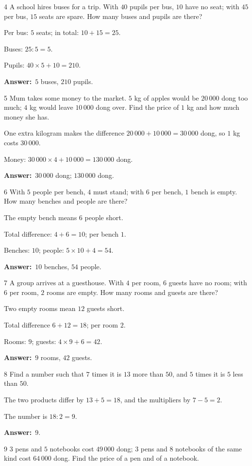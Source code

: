 \documentclass[11pt]{article}
\newif\ifsol \solfalse
\providecommand{\AnsWord}{Đáp số}
\newcommand{\dapso}[1]{\par\textbf{\AnsWord:}\ #1}
\newcommand{\probsol}[1]{%
  \begin{lrbox}{\solmeasure}\begin{minipage}{\dimexpr\linewidth-24pt\relax}#1\end{minipage}\end{lrbox}%
  \ifsol
    \begin{solbox}#1\end{solbox}%
  \else
    \setlength{\solht}{\dimexpr\ht\solmeasure+\dp\solmeasure+0.85cm\relax}%
    \ifdim\solht<1.35cm\setlength{\solht}{1.35cm}\fi
    \begin{tcolorbox}[colback=white,colframe=Line,boxrule=0.8pt,arc=5pt,
      left=8pt,right=8pt,top=4pt,bottom=4pt,height=\solht]{\footnotesize\color{Slate}\itshape\WorkWord}\end{tcolorbox}%
  \fi}
\newcommand{\gap}{\vspace{0.3cm}}
\def\WorkWord{Your work:}
\def\AnsWord{Answer}
\begin{document}
\gap
\begin{probbox}{4}{\relax}
A school hires buses for a trip. With $40$ pupils per bus, $10$ have no seat; with $45$ per bus, $15$ seats are spare. How many buses and pupils are there?
\end{probbox}
\probsol{
Per bus: $5$ seats; in total: $10+15=25$.\par Buses: $25:5=5$.\par Pupils: $40\times5+10=210$.
\dapso{$5$ buses, $210$ pupils.}}
\gap
\begin{probbox}{5}{\relax}
Mum takes some money to the market. $5$ kg of apples would be $20\,000$ dong too much; $4$ kg would leave $10\,000$ dong over. Find the price of $1$ kg and how much money she has.
\end{probbox}
\probsol{
One extra kilogram makes the difference $20\,000+10\,000=30\,000$ dong, so $1$ kg costs $30\,000$.\par Money: $30\,000\times4+10\,000=130\,000$ dong.
\dapso{$30\,000$ dong; $130\,000$ dong.}}
\gap
\begin{probbox}{6}{\relax}
With $5$ people per bench, $4$ must stand; with $6$ per bench, $1$ bench is empty. How many benches and people are there?
\end{probbox}
\probsol{
The empty bench means $6$ people short.\par Total difference: $4+6=10$; per bench $1$.\par Benches: $10$; people: $5\times10+4=54$.
\dapso{$10$ benches, $54$ people.}}
\gap
\begin{probbox}{7}{\relax}
A group arrives at a guesthouse. With $4$ per room, $6$ guests have no room; with $6$ per room, $2$ rooms are empty. How many rooms and guests are there?
\end{probbox}
\probsol{
Two empty rooms mean $12$ guests short.\par Total difference $6+12=18$; per room $2$.\par Rooms: $9$; guests: $4\times9+6=42$.
\dapso{$9$ rooms, $42$ guests.}}
\gap
\begin{probbox}{8}{\relax}
Find a number such that $7$ times it is $13$ more than $50$, and $5$ times it is $5$ less than $50$.
\end{probbox}
\probsol{
The two products differ by $13+5=18$, and the multipliers by $7-5=2$.\par The number is $18:2=9$.
\dapso{$9$.}}
\gap
\begin{probbox}{9}{\relax}
$3$ pens and $5$ notebooks cost $49\,000$ dong; $3$ pens and $8$ notebooks of the same kind cost $64\,000$ dong. Find the price of a pen and of a notebook.
\end{probbox}
\end{document}
